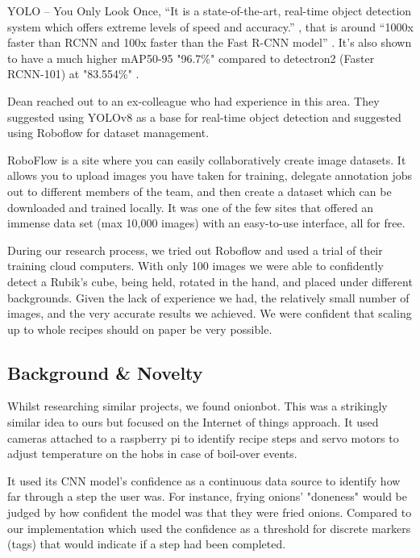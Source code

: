 \documentclass{article}
\begin{document}
YOLO – You Only Look Once, “It is a state-of-the-art, real-time object
detection system which offers extreme levels of speed and accuracy.”
\cite{rajeshwari2019object}, that is around “1000x faster than RCNN and 100x
faster than the Fast R-CNN model” \cite{rajeshwari2019object}. It's also shown
to have a much higher mAP50-95 "96.7\%" compared to detectron2 (Faster
RCNN-101) at "83.554\%" \cite{ai5010005}.

Dean reached out to an ex-colleague who had experience in this area. They
suggested using YOLOv8 \cite{Jocher_Ultralytics_YOLO_2023} as a base for
real-time object detection and suggested using Roboflow
\cite{RoboFlow-Software} for dataset management.

RoboFlow \cite{RoboFlow-Software} is a site where you can easily
collaboratively create image datasets. It allows you to upload images you have
taken for training, delegate annotation jobs out to different members of the
team, and then create a dataset which can be downloaded and trained locally. It
was one of the few sites that offered an immense data set (max 10,000 images)
with an easy-to-use interface, all for free.

During our research process, we tried out Roboflow and used a trial of their
training cloud computers. With only 100 images we were able to confidently
detect a Rubik's cube, being held, rotated in the hand, and placed under
different backgrounds. Given the lack of experience we had, the relatively
small number of images, and the very accurate results we achieved. We were
confident that scaling up to whole recipes should on paper be very possible.

\subsection{Background \& Novelty}
Whilst researching similar projects, we found
onionbot\cite{cobley2020onionbot}\cite{OnionBot-github}. This was a strikingly
similar idea to ours but focused on the Internet of things approach. It used
cameras attached to a raspberry pi to identify recipe steps and servo motors to
adjust temperature on the hobs in case of boil-over events.

It used its CNN model’s confidence as a continuous data source to identify how
far through a step the user was. For instance, frying onions' "doneness" would
be judged by how confident the model was that they were fried onions. Compared
to our implementation which used the confidence as a threshold for discrete
markers (tags) that would indicate if a step had been completed.
\end{document}

